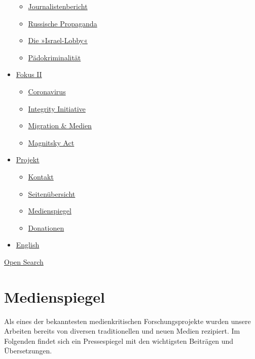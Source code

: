 \begin{itemize}
  \begin{itemize}
  \tightlist
  \item
    \href{https://swprs.org/bericht-eines-journalisten/}{Journalistenbericht}
  \item
    \href{https://swprs.org/russische-propaganda/}{Russische Propaganda}
  \item
    \href{https://swprs.org/die-israel-lobby-fakten-und-mythen/}{Die
    »Israel-Lobby«}
  \item
    \href{https://swprs.org/geopolitik-und-paedokriminalitaet/}{Pädokriminalität}
  \end{itemize}
\item
  \href{https://swprs.org/migration-und-medien/}{Fokus II}

  \begin{itemize}
  \tightlist
  \item
    \href{https://swprs.org/covid-19-hinweis-ii/}{Coronavirus}
  \item
    \href{https://swprs.org/die-integrity-initiative/}{Integrity
    Initiative}
  \item
    \href{https://swprs.org/migration-und-medien/}{Migration \& Medien}
  \item
    \href{https://swprs.org/der-fall-magnitsky/}{Magnitsky Act}
  \end{itemize}
\item
  \href{https://swprs.org/kontakt/}{Projekt}

  \begin{itemize}
  \tightlist
  \item
    \href{https://swprs.org/kontakt/}{Kontakt}
  \item
    \href{https://swprs.org/uebersicht/}{Seitenübersicht}
  \item
    \href{https://swprs.org/medienspiegel/}{Medienspiegel}
  \item
    \href{https://swprs.org/donationen/}{Donationen}
  \end{itemize}
\item
  \href{https://swprs.org/contact/}{English}
\end{itemize}

\protect\hyperlink{}{Open Search}

\hypertarget{medienspiegel}{%
\section{Medienspiegel}\label{medienspiegel}}

Als eines der bekanntesten medienkritischen Forschungsprojekte wurden
unsere Arbeiten bereits von diversen traditionellen und neuen Medien
rezipiert. Im Folgenden findet sich ein Pressespiegel mit den
wichtigsten Beiträgen und Übersetzungen.

